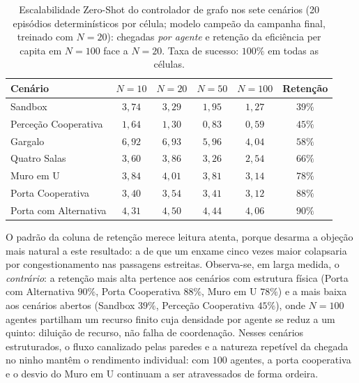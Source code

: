 \documentclass[12pt,reqno, twoside]{amsbook}
\theoremstyle{plain}
\numberwithin{equation}{chapter}
\numberwithin{section}{chapter}
\numberwithin{table}{chapter}
\numberwithin{figure}{chapter}
\begin{document}
\begin{table}[!htbp]
\centering
\footnotesize
\caption[Escalabilidade \textit{Zero-Shot} nos sete cenários]{Escalabilidade Zero-Shot do controlador de grafo nos sete cenários (20 episódios determinísticos por célula; modelo campeão da campanha final, treinado com $N=20$): chegadas \emph{por agente} e retenção da eficiência per capita em $N=100$ face a $N=20$. Taxa de sucesso: $100\%$ em todas as células.}
\label{tab:res_scale_all}
\renewcommand{\arraystretch}{1.25}
\begin{tabular}{|l|c|c|c|c|c|}
\hline
\textbf{Cenário} & \textbf{$N=10$} & \textbf{$N=20$} & \textbf{$N=50$} & \textbf{$N=100$} & \textbf{Retenção} \\ \hline
Sandbox & $3{,}74$ & $3{,}29$ & $1{,}95$ & $1{,}27$ & $39\%$ \\ \hline
Perceção Cooperativa & $1{,}64$ & $1{,}30$ & $0{,}83$ & $0{,}59$ & $45\%$ \\ \hline
Gargalo & $6{,}92$ & $6{,}93$ & $5{,}96$ & $4{,}04$ & $58\%$ \\ \hline
Quatro Salas & $3{,}60$ & $3{,}86$ & $3{,}26$ & $2{,}54$ & $66\%$ \\ \hline
Muro em U & $3{,}84$ & $4{,}01$ & $3{,}81$ & $3{,}14$ & $78\%$ \\ \hline
Porta Cooperativa & $3{,}40$ & $3{,}54$ & $3{,}41$ & $3{,}12$ & $88\%$ \\ \hline
Porta com Alternativa & $4{,}31$ & $4{,}50$ & $4{,}44$ & $4{,}06$ & $90\%$ \\ \hline
\end{tabular}
\end{table}

O padrão da coluna de retenção merece leitura atenta, porque desarma a objeção mais natural a este resultado: a de que um enxame cinco vezes maior colapsaria por congestionamento nas passagens estreitas. Observa-se, em larga medida, o \emph{contrário}: a retenção mais alta pertence aos cenários com estrutura física (Porta com Alternativa $90\%$, Porta Cooperativa $88\%$, Muro em U $78\%$) e a mais baixa aos cenários abertos (Sandbox $39\%$, Perceção Cooperativa $45\%$), onde $N=100$ agentes partilham um recurso finito cuja densidade por agente se reduz a um quinto: diluição de recurso, não falha de coordenação. Nesses cenários estruturados, o fluxo canalizado pelas paredes e a natureza repetível da chegada no ninho mantêm o rendimento individual: com $100$ agentes, a porta cooperativa e o desvio do Muro em U continuam a ser atravessados de forma ordeira.
\end{document}
